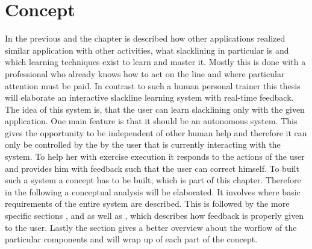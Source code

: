 \chapter{Concept}
In the previous \textbf{} and the \textbf{} chapter is described how other applications realized similar application with other activities, what slacklining in particular is and which learning techniques exist to learn and master it. Mostly this is done with a professional who already knows how to act on the line and where particular attention must be paid. In contrast to such a human personal trainer this thesis will elaborate an interactive slackline learning system with real-time feedback. The idea of this system is, that the user can learn slacklining only with the given application. One main feature is that it should be an autonomous system. This gives the opportunity to be independent of other human help and therefore it can only 
be controlled by the by the user that is currently interacting with the system. To help her with exercise execution it responds to the actions of the user and provides him with feedback such that the user can correct himself. To built such a system a concept has to be built, which is part of this chapter. Therefore in the following a conceptual analysis will be elaborated. It involves \textbf{} where basic requirements of the entire system are described. This is followed by the more specific sections \textbf{}, \textbf{} and \textbf{} as well as \textbf{}, which describes how feedback is properly given to the user. Lastly the section \textbf{} gives a better overview about the worflow of the particular components and \textbf{} will wrap up of each part of the concept.






